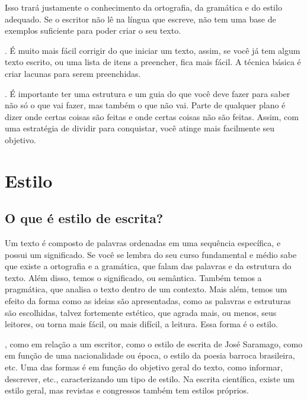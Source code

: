 \documentclass[openany]{book}
\begin{document}
 Isso trará justamente o conhecimento da ortografia, da gramática e do estilo adequado. Se o escritor não lê na língua que escreve, não tem uma base de exemplos suficiente para poder criar o seu texto.

. É muito mais fácil corrigir do que iniciar um texto, assim, se você já tem algum texto escrito, ou uma lista de itens a preencher, fica mais fácil. A técnica básica é criar lacunas para serem preenchidas.

. É importante ter uma estrutura e um guia do que você deve fazer para saber não só o que vai fazer, mas também o que não vai. Parte de qualquer plano é dizer onde certas coisas são feitas e onde certas coisas não são feitas. Assim, com uma estratégia de dividir para conquistar, você atinge mais facilmente seu objetivo.


\chapter{Estilo}

\section{O que é estilo de escrita?}

 Um texto é composto de palavras ordenadas em uma sequência específica, e possui um significado. Se você se lembra do seu curso fundamental e médio sabe que existe a ortografia e a gramática, que falam das palavras e da estrutura do texto. Além disso, temos o significado, ou semântica. Também temos a pragmática, que analisa o texto dentro de um contexto. Mais além, temos um efeito da forma como as ideias são apresentadas, como as palavras e estruturas são escolhidas, talvez fortemente estético, que agrada mais, ou menos, seus leitores, ou torna mais fácil, ou mais difícil, a leitura. Essa forma é o estilo.

, como em relação a um escritor, como o estilo de escrita de José Saramago, como em função de uma nacionalidade ou época, o estilo da poesia barroca brasileira, etc. Uma das formas é em função do objetivo geral do texto, como informar, descrever, etc., caracterizando um tipo de estilo. Na escrita científica, existe um estilo geral, mas revistas e congressos também tem estilos próprios.
\end{document}
